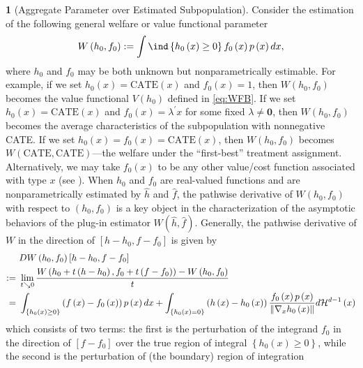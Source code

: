 \documentclass[12pt,american]{article}
\theoremstyle{definition}
\newtheorem{example}{\protect\examplename}
\theoremstyle{plain}
\theoremstyle{definition}
\theoremstyle{plain}
\theoremstyle{plain}
\theoremstyle{plain}
\theoremstyle{plain}
\theoremstyle{plain}
\newcommand{\norm}[1]{\left\| #1 \right\|}
\providecommand{\examplename}{Example}
\providecommand{\examplename}{Example}
\begin{document}
\begin{example}[Aggregate Parameter over Estimated Subpopulation]
  \label{exa:EstSubpop} Consider the estimation of
  the following general welfare or value functional parameter
  \[
    W\left(h_{0},f_{0}\right):=\int\ind\left\{ h_{0}\left(x\right)\geq0\right\}f_{0}\left(x\right)p\left(x\right)dx,
  \]
  where $h_{0}$ and $f_{0}$ may be both unknown but nonparametrically
  estimable. For example, if we set $h_{0}(x)=\text{CATE}(x)$ and $f_{0}(x)=1$, then $W\left(h_{0},f_{0}\right)$ becomes the value functional $V(h_0)$ defined in \eqref{eq:WFB}. If we set $h_{0}(x)=\text{CATE}(x)$ and $f_{0}(x)=\lambda^{'}x$ for some fixed $\lambda \neq \textbf{0}$, then $W\left(h_{0},f_{0}\right)$
  becomes the average characteristics of the subpopulation with nonnegative
  CATE. If we set $h_{0}\left(x\right)=f_{0}\left(x\right)=\text{CATE}\left(x\right)$,
  then $W\left(h_{0},f_{0}\right)$ becomes $W\left(\text{CATE},\text{CATE}\right)$---the welfare under the ``first-best''
  treatment assignment. Alternatively, we may take $f_{0}\left(x\right)$
  to be any other value/cost function associated with type $x$ (see \citep*{CCG2025}). When $h_{0}$ and $f_{0}$ are real-valued functions and are nonparametrically estimated by $\hat{h}$ and $\hat{f}$,
  the pathwise derivative of $W\left(h_{0},f_{0}\right)$ with respect
  to $\left(h_{0},f_0\right)$ is a key object in the characterization
  of the asymptotic behaviors of the plug-in estimator $W\left(\hat{h},\hat{f}\right)$.
  Generally, the pathwise derivative of $W$ in the direction of $\left[h-h_{0},f-f_{0}\right]$
  is given by
  \begin{align}
    & DW\left(h_{0},f_{0}\right)\left[h-h_{0},f-f_{0}\right]\nonumber \\
    :=\  & \lim_{t\downto0}\frac{W\left(h_{0}+t\left(h-h_{0}\right),f_{0}+t\left(f-f_{0}\right)\right)-W\left(h_{0},f_{0}\right)}{t}\nonumber \\
    =\  & \int_{\left\{ h_{0}\left(x\right)\geq0\right\} }\left(f\left(x\right)-f_{0}\left(x\right)\right)p\left(x\right)dx+\int_{\left\{ h_{0}\left(x\right)=0\right\} }\left(h\left(x\right)-h_{0}\left(x\right)\right)\frac{f_{0}\left(x\right)p\left(x\right)}{\norm{\Dif_{x}h_{0}\left(x\right)}}d{\cal H}^{d-1}\left(x\right)\label{eq:NPcontour-1}
  \end{align}
  which consists of two terms: the first is the perturbation of the
  integrand $f_{0}$ in the direction of $[f-f_{0}]$ over the true region
  of integral $\left\{ h_{0}\left(x\right)\geq0\right\} $, while the
  second is the perturbation of (the boundary) region of integration

\end{example}
\end{document}
